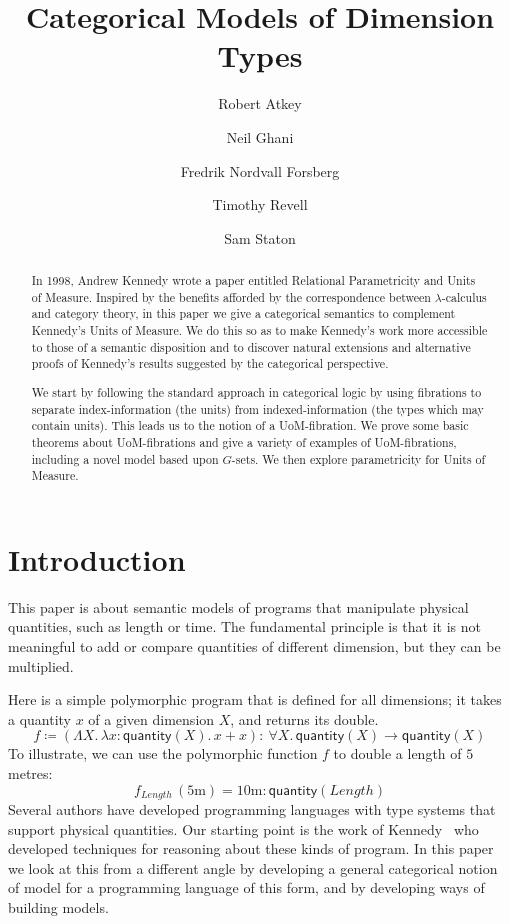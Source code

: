 \documentclass[a4paper,UKenglish]{lipics}
\title{Categorical Models of Dimension Types}
\author[1]{Robert Atkey}
\author[2]{Neil Ghani}
\author[2]{Fredrik Nordvall Forsberg}
\author[2]{Timothy Revell}
\author[3]{Sam Staton}
\affil[1]{University of Edinburgh}
\affil[2]{University of Strathclyde}
\affil[3]{University of Cambridge}
\newcommand{\UoM}{Units of Measure\xspace}
\newcommand{\msf}[1]{\mathsf{#1}} %
\newcommand{\num}{\msf{quantity}}
\newcommand{\length}{\mathit{Length}}
\newcommand{\UoMFibrations}{UoM-fibrations\xspace}
\begin{document}
\maketitle

\begin{abstract}

  In 1998, Andrew Kennedy wrote a paper entitled Relational Parametricity and \UoM\cite{Kennedy:1997:RPU:263699.263761}. Inspired by the benefits afforded by the correspondence between $\lambda$-calculus and category theory, in this paper we give a categorical semantics to complement Kennedy's \UoM. We do this so as to make Kennedy's work more accessible to those of a semantic disposition and to discover natural extensions and alternative proofs of Kennedy's results suggested by the categorical perspective.

  We start by following the standard approach in categorical logic by using fibrations to separate index-information (the units) from indexed-information (the types which may contain units). This leads us to the notion of a UoM-fibration. We prove some basic theorems about UoM-fibrations and give a variety of examples of \UoMFibrations, including a novel model based upon $G$-sets. We then explore parametricity for \UoM.
\end{abstract}

\section{Introduction}
This paper is about semantic models of programs
that manipulate physical quantities, such
as length or time. The fundamental principle is that it is not
meaningful to add or compare quantities of different dimension, but
they can be multiplied.

Here is a simple polymorphic program that is defined for all dimensions;
it takes a quantity $x$ of a given dimension $X$, and returns its double.
\begin{equation}
f\coloneqq (\Lambda X.\,\lambda x:\num(X).\,x+x)
:\ \forall X.\,\num(X)\to \num(X)
\label{eqn:double}
\end{equation}
To illustrate, we can use the polymorphic
function $f$ to double a length of $5$ metres:
\begin{equation}
f_\length\,(5\mathrm{m})=
10\mathrm{m}:\num(\length)
\label{eqn:doubleapp}
\end{equation}
Several authors have developed programming languages with type systems
that support physical quantities. Our starting point is the work of
Kennedy~\cite{} who developed techniques for reasoning about these
kinds of program. In this paper we look at this from a different
angle by
developing a general categorical notion of model for a programming
language of this form, and by developing ways of building models.
\end{document}
